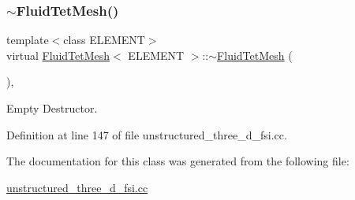 \mbox{\label{classFluidTetMesh_ae3f6cdb8d95cfe46c8f1fc15dd438b42}} 
\subsubsection{\texorpdfstring{$\sim$\+Fluid\+Tet\+Mesh()}{~FluidTetMesh()}}
{\footnotesize\ttfamily template$<$class E\+L\+E\+M\+E\+NT$>$ \\
virtual \hyperlink{classFluidTetMesh}{Fluid\+Tet\+Mesh}$<$ E\+L\+E\+M\+E\+NT $>$\+::$\sim$\hyperlink{classFluidTetMesh}{Fluid\+Tet\+Mesh} (\begin{DoxyParamCaption}{ }\end{DoxyParamCaption})\hspace{0.3cm}{\ttfamily [inline]}, {\ttfamily [virtual]}}



Empty Destructor. 



Definition at line 147 of file unstructured\+\_\+three\+\_\+d\+\_\+fsi.\+cc.



The documentation for this class was generated from the following file\+:\begin{DoxyCompactItemize}
\item 
\hyperlink{unstructured__three__d__fsi_8cc}{unstructured\+\_\+three\+\_\+d\+\_\+fsi.\+cc}\end{DoxyCompactItemize}
